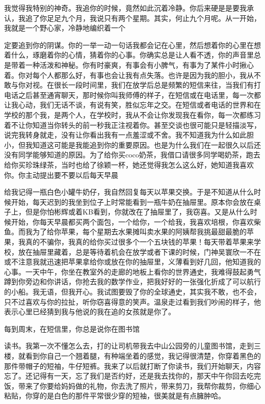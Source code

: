 \documentclass{article}
\begin{document}
我觉得我特别的神奇。我追你的时候，竟然如此沉着冷静。你后来硬是是要我承认，我追了你足足九个月，我说只有两个星期。其实，何止九个月呢。从一开始，我就是一个野心家，冷静地编织着一个

\newpage 

定要追到你的阴谋。你的一举一动一句话我都会记在心里，然后想着你的心里在想着什么，琢磨着你的心情，猜着你的心事。你确实总是让人看不透，你的声音里总是带着一种活泼和神秘。你有时豪爽，有事会有小脾气，有事为了某件小时揪心着。你对每个人都那么好，有事也会让我有点失落。也许是因为我的胆小，我从不敢与你对视。在很长一段时间里，我们在放学后总是频繁的短信来往，当我们有打电话之后甚至通宵聊天，那时候你叫我师傅的样子，在短信或在电话里，每一次都让我心动，我们无话不谈，有说有笑，胜似忘年之交。在短信或者电话的世界和在学校的那个我，是两个人，在学校时，我从不会让你发现我在看你，每一次都练习着不让你知道当你转头的前一秒我正注视着你。甚至交谈也很可能只是轻描淡写，说完我转身就走，没有让你看出我有一点羞涩或不舍。我不知道我为什么如此胆小，但我知道这可能是我能追到你的重要原因。也是为什么我们在一起很久以后还没有同学能够知道的原因。为了给你买coco奶茶，我借口请很多同学喝奶茶，跑去给你买珍珠绿茶，当时也给了徐颖一杯，她还觉得我怎么这么好，她知道我喜欢你。你主动提出要不要以后每天早晨

\newpage 

给我记得一瓶白色小罐牛奶仔，我自然回复每天以苹果交换。于是不知道从什么时候开始，每天迟到的我坐到位子上时常能看到一瓶牛奶在抽屉里。原本你会放在桌子上，但是你怕彬辉或着KB看到，你就改在了抽屉里了，我窃喜。又是从什么时候开始，你每天早晨都买两个面包，一个给你，一个给我，我喜欢培根，你喜欢柴鱼。而我为了给你苹果，每个星期去水果摊叫卖水果的阿姨帮我挑最甜最脆的苹果，我真的不骗你，我真的给你买过很多个一个五块钱的苹果！每天带着苹果来学校，放在抽屉里藏着，总是等待着机会在放学或者下课的时候，门神吴寰欣一不在或不注意我就迅速把苹果拿给你或放在你的抽屉里，义薄看到好几回，他知道我的心事。一天中午，你坐在教室外的走廊的地板上看你的世界通史，我难得鼓起勇气蹲到你旁边和你讲话，你抢去我的数学作业，把我好好的一张强化折成了可以航行的小船。我无语，但我开心。我试图要毁了你的全球通史，其实我不敢，也不会，只不过喜欢与你的拉扯，听你窃喜得意的笑声。温泉走过看到我们吵闹的样子，他表示心里已经猜到我与他说的我在追的女孩就是你了。

每到周末，在短信里，你总是说你在图书馆

\newpage 

读书。我第一次不懂怎么去，打的让司机带我去中山公园旁的儿童图书馆，走到三楼，就看到你自己一个翘着腿，有种端坐着的感觉，我记得很清楚，你穿着黑色的那件带帽子的短袖，牛仔短裤。我来了以后就打断了你读书，我们开始聊天，内容忘了。还记得有一天，忘了我们是否约好，还是我去找你的，那天中午你回去吃完饭，带来了你要给妈妈做的礼物，你去洗了照片，带来剪刀，我帮你裁剪，你细心粘贴，你穿的是白色的那件平常很少穿的短袖，很美就是有点臃肿哈。
\end{document}
